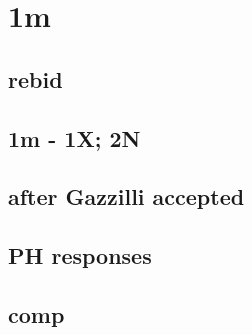 \section{1m}



\subsection{rebid}


\subsection{1m - 1X; 2N}

\subsection{after Gazzilli accepted}


\subsection{PH responses}


\subsection{comp}


